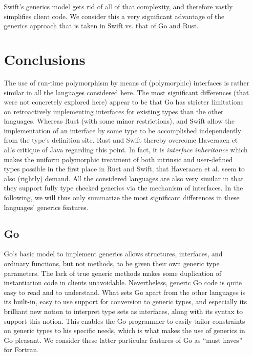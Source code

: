 \documentclass[11pt,oneside]{report}
\begin{document}
Swift's generics model gets rid of all of that complexity, and
therefore vastly simplifies client code. We consider this a very
significant advantage of the generics approach that is taken in Swift
vs. that of Go and Rust.


\section{Conclusions}

The use of run-time polymorphism by means of (polymorphic) interfaces
is rather similar in all the languages considered here. The most
significant differences (that were not concretely explored here)
appear to be that Go has stricter limitations on retroactively
implementing interfaces for existing types than the other
languages. Whereas Rust (with some minor restrictions), and Swift
allow the implementation of an interface by some type to be
accomplished independently from the type's definition site. Rust and
Swift thereby overcome Haveraaen et al.'s critique
\cite{Haveraaen_et_al_19} of Java regarding this point. In fact, it is
\emph{interface inheritance} which makes the uniform polymorphic
treatment of both intrinsic and user-defined types possible in the
first place in Rust and Swift, that Haveraaen et al. seem to also
(rightly) demand. All the considered languages are also very similar
in that they support fully type checked generics via the mechanism
of interfaces. In the following, we will thus only summarize the most
significant differences in these languages' generics features.

\subsection{Go}

Go's basic model to implement generics allows structures, interfaces,
and ordinary functions, but not methods, to be given their own generic
type parameters. The lack of true generic methods makes some
duplication of instantiation code in clients
unavoidable. Nevertheless, generic Go code is quite easy to read and
to understand. What sets Go apart from the other languages is its
built-in, easy to use support for conversion to generic types, and
especially its brilliant new notion to interpret type sets as
interfaces, along with its syntax to support this notion. This enables
the Go programmer to easily tailor constraints on generic types to his
specific needs, which is what makes the use of generics in Go
pleasant. We consider these latter particular features of Go as ``must
haves'' for Fortran.
\end{document}
